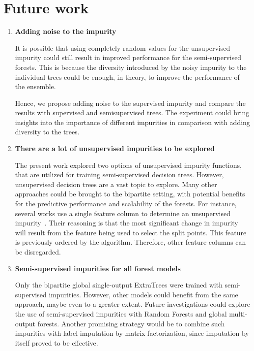 \section{Future work}

\begin{enumerate}
    \item \textbf{Adding noise to the impurity}

    It is possible that using completely random values for the unsupervised impurity could still result in improved performance for the semi-supervised forests. This is because the diversity introduced by the noisy impurity to the individual trees could be enough, in theory, to improve the performance of the ensemble.

    Hence, we propose adding noise to the supervised impurity and compare the results with supervised and semisupervised trees. The experiment could bring insights into the importance of different impurities in comparison with adding diversity to the trees.


    \item \textbf{There are a lot of unsupervised impurities to be explored}

    The present work explored two options of unsupervised impurity functions, that are utilized for training semi-supervised decision trees. However, unsupervised decision trees are a vast topic to explore. Many other approaches could be brought to the bipartite setting, with potential benefits for the predictive performance and scalability of the forests.
    For instance, several works use a single feature column to determine an unsupervised impurity~\cite{}. Their reasoning is that the most significant change in impurity will result from the feature being used to select the split points. This feature is previously ordered by the algorithm. Therefore, other feature columns can be disregarded.

    \item \textbf{Semi-supervised impurities for all forest models}

    Only the bipartite global single-output ExtraTrees were trained with semi-supervised impurities. However, other models could benefit from the same approach, maybe even to a greater extent. Future investigations could explore the use of semi-supervised impurities with Random Forests and global multi-output forests. Another promising strategy would be to combine such impurities with label imputation by matrix factorization, since imputation by itself proved to be effective.


\end{enumerate}
